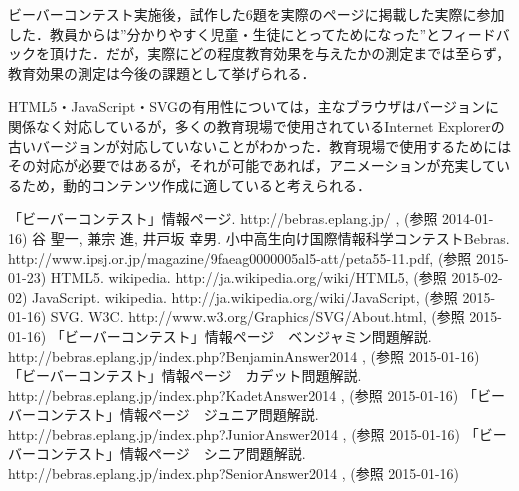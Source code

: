 \documentclass[a4paper]{jarticle}
\begin{document}
\begin{multicols}{2}
ビーバーコンテスト実施後，試作した6題を実際のページに掲載した実際に参加した．教員からは”分かりやすく児童・生徒にとってためになった”とフィードバックを頂けた．だが，実際にどの程度教育効果を与えたかの測定までは至らず，教育効果の測定は今後の課題として挙げられる．

HTML5・JavaScript・SVGの有用性については，主なブラウザはバージョンに関係なく対応しているが，多くの教育現場で使用されているInternet Explorerの古いバージョンが対応していないことがわかった．教育現場で使用するためにはその対応が必要ではあるが，それが可能であれば，アニメーションが充実しているため，動的コンテンツ作成に適していると考えられる．

\end{multicols}

\begin{thebibliography}{1}

 「ビーバーコンテスト」情報ページ.  http://bebras.eplang.jp/ , (参照 2014-01-16)
 谷 聖一, 兼宗 進, 井戸坂 幸男. 小中高生向け国際情報科学コンテストBebras.  http://www.ipsj.or.jp/magazine/9faeag0000005al5-att/peta55-11.pdf, (参照 2015-01-23)
 HTML5. wikipedia. http://ja.wikipedia.org/wiki/HTML5, (参照 2015-02-02)
 JavaScript. wikipedia. http://ja.wikipedia.org/wiki/JavaScript, (参照 2015-01-16)
 SVG. W3C. http://www.w3.org/Graphics/SVG/About.html, (参照 2015-01-16)
 「ビーバーコンテスト」情報ページ　ベンジャミン問題解説. http://bebras.eplang.jp/index.php?BenjaminAnswer2014 , (参照 2015-01-16)
 「ビーバーコンテスト」情報ページ　カデット問題解説.  http://bebras.eplang.jp/index.php?KadetAnswer2014 , (参照 2015-01-16)
 「ビーバーコンテスト」情報ページ　ジュニア問題解説.  http://bebras.eplang.jp/index.php?JuniorAnswer2014 , (参照 2015-01-16)
 「ビーバーコンテスト」情報ページ　シニア問題解説.  http://bebras.eplang.jp/index.php?SeniorAnswer2014 , (参照 2015-01-16)

\end{thebibliography}
\end{document}
